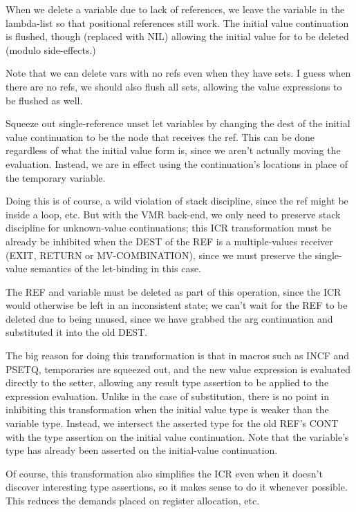 When we delete a variable due to lack of references, we leave the variable
in the lambda-list so that positional references still work.  The initial value
continuation is flushed, though (replaced with NIL) allowing the initial value
for to be deleted (modulo side-effects.)

Note that we can delete vars with no refs even when they have sets.  I guess
when there are no refs, we should also flush all sets, allowing the value
expressions to be flushed as well.

Squeeze out single-reference unset let variables by changing the dest of the
initial value continuation to be the node that receives the ref.  This can be
done regardless of what the initial value form is, since we aren't actually
moving the evaluation.  Instead, we are in effect using the continuation's
locations in place of the temporary variable.  

Doing this is of course, a wild violation of stack discipline, since the ref
might be inside a loop, etc.  But with the VMR back-end, we only need to
preserve stack discipline for unknown-value continuations; this ICR
transformation must be already be inhibited when the DEST of the REF is a
multiple-values receiver (EXIT, RETURN or MV-COMBINATION), since we must
preserve the single-value semantics of the let-binding in this case.

The REF and variable must be deleted as part of this operation, since the ICR
would otherwise be left in an inconsistent state; we can't wait for the REF to
be deleted due to being unused, since we have grabbed the arg continuation and
substituted it into the old DEST.

The big reason for doing this transformation is that in macros such as INCF and
PSETQ, temporaries are squeezed out, and the new value expression is evaluated
directly to the setter, allowing any result type assertion to be applied to the
expression evaluation.  Unlike in the case of substitution, there is no point
in inhibiting this transformation when the initial value type is weaker than
the variable type.  Instead, we intersect the asserted type for the old REF's
CONT with the type assertion on the initial value continuation.  Note that the
variable's type has already been asserted on the initial-value continuation.

Of course, this transformation also simplifies the ICR even when it doesn't
discover interesting type assertions, so it makes sense to do it whenever
possible.  This reduces the demands placed on register allocation, etc.


